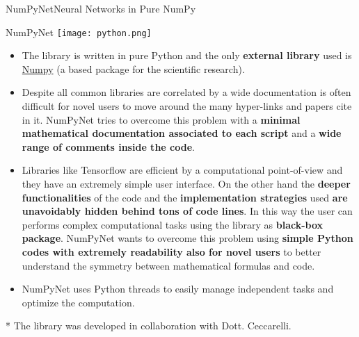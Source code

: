 \documentclass[10pt, technote, oribibl, unicode]{beamer}
\begin{document}
\begin{frame}{NumPyNet}{Neural Networks in Pure NumPy}


  \begin{block}{NumPyNet \hfill\texttt{[image: python.png]}}
    \begin{itemize}
      \item The library is written in pure \textsf{Python} and the only \textbf{external library} used is \href{http://www.numpy.org}{\textsf{Numpy}} (a based package for the scientific research).

      \item Despite all common libraries are correlated by a wide documentation is often difficult for novel users to move around the many hyper-links and papers cite in it.
      \textsf{NumPyNet} tries to overcome this problem with a \textbf{minimal mathematical documentation associated to each script} and a \textbf{wide range of comments inside the code}.

      \item Libraries like \textsf{Tensorflow} are efficient by a computational point-of-view and they have an extremely simple user interface.
      On the other hand the \textbf{deeper functionalities} of the code and the \textbf{implementation strategies} used \textbf{are unavoidably hidden behind tons of code lines}.
      In this way the user can performs complex computational tasks using the library as \textbf{black-box package}.
      \textsf{NumPyNet} wants to overcome this problem using \textbf{simple \textsf{Python} codes with extremely readability also for novel users} to better understand the symmetry between mathematical formulas and code.

      \item \textsf{NumPyNet} uses \textsf{Python} threads to easily manage independent tasks and optimize the computation.

    \end{itemize}
  \end{block}

  \vfill\scriptsize{* The library was developed in collaboration with Dott. Ceccarelli.}

\end{frame}
\end{document}
